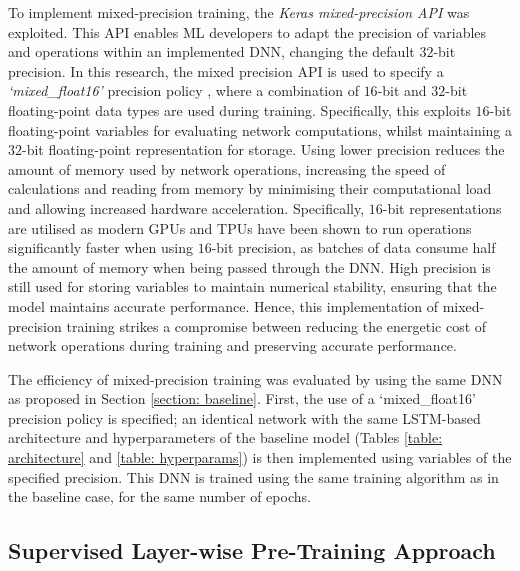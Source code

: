 \documentclass[a4paper, 11pt]{report}
\begin{document}
    To implement mixed-precision training, the \emph{Keras mixed-precision API} \citep{abadi-2016} was exploited. This API enables ML developers to adapt the precision of variables and operations within an implemented DNN, changing the default $32$-bit precision. In this research, the mixed precision API is used to specify a \emph{`mixed\_float16'} precision policy \citep{abadi-2016}, where a combination of $16$-bit and $32$-bit floating-point data types are used during training. Specifically, this exploits $16$-bit floating-point variables for evaluating network computations, whilst maintaining a $32$-bit floating-point representation for storage. Using lower precision reduces the amount of memory used by network operations, increasing the speed of calculations and reading from memory by minimising their computational load and allowing increased hardware acceleration. Specifically, $16$-bit representations are utilised as modern GPUs and TPUs have been shown to run operations significantly faster when using $16$-bit precision, as batches of data consume half the amount of memory when being passed through the DNN. High precision is still used for storing variables to maintain numerical stability, ensuring that the model maintains accurate performance. Hence, this implementation of mixed-precision training strikes a compromise between reducing the energetic cost of network operations during training and preserving accurate performance.

    The efficiency of mixed-precision training was evaluated by using the same DNN as proposed in Section \ref{section: baseline}. First, the use of a `mixed\_float16' precision policy is specified; an identical network with the same LSTM-based architecture and hyperparameters of the baseline model (Tables \ref{table: architecture} and \ref{table: hyperparams}) is then implemented using variables of the specified precision. This DNN is trained using the same training algorithm as in the baseline case, for the same number of epochs.


    \subsection{Supervised Layer-wise Pre-Training Approach}
\end{document}

